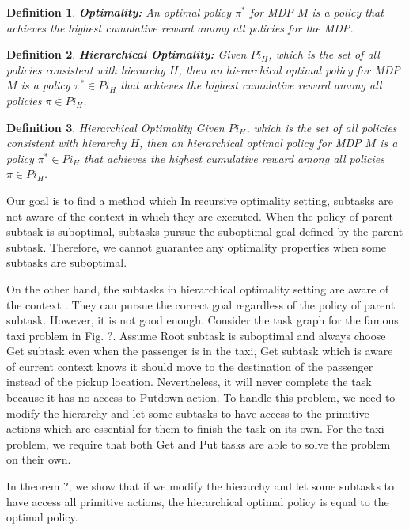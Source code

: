 \documentclass{article} %
\newtheorem{definition}{Definition}
\begin{document}
\begin{definition}
    \textbf{Optimality:} An optimal policy $\pi^*$ for MDP $M$ is a policy that achieves the highest cumulative reward
    among all policies for the MDP.
\end{definition}
\begin{definition}
    \textbf{Hierarchical Optimality:} Given $Pi_H$, which is the set of all policies consistent with hierarchy $H$, 
    then an hierarchical optimal policy for MDP $M$ is a policy $\pi^* \in Pi_H$ that achieves the highest cumulative reward
    among all policies $\pi \in Pi_H$.
\end{definition}
\begin{definition}
    Hierarchical Optimality Given $Pi_H$, which is the set of all policies consistent with hierarchy $H$, 
    then an hierarchical optimal policy for MDP $M$ is a policy $\pi^* \in Pi_H$ that achieves the highest cumulative reward
    among all policies $\pi \in Pi_H$.
\end{definition}

Our goal is to find a method which 
In recursive optimality setting, subtasks are not aware of the context in which they are executed.
When the policy of parent subtask is suboptimal, subtasks pursue the suboptimal goal defined by the parent subtask.
Therefore, we cannot guarantee any optimality properties when some subtasks are suboptimal.

On the other hand, the subtasks in hierarchical optimality setting are aware of the context . 
They can pursue the correct goal regardless of the policy of parent subtask.
However, it is not good enough. Consider the task graph for the famous taxi problem in Fig. ?.  
Assume Root subtask is suboptimal and always choose Get subtask even when 
the passenger is in the taxi, Get subtask which is aware of current context knows
it should move to the destination of the passenger instead of the pickup location.
Nevertheless, it will never complete the task because it has no access to Putdown 
action. To handle this problem, we need to modify the hierarchy and let some subtasks 
to have access to the primitive actions which are essential for them to finish
the task on its own. For the taxi problem, we require that both Get and Put tasks
are able to solve the problem on their own.

In theorem ?, we show that if we modify the hierarchy and let some subtasks to have access all primitive actions, 
the hierarchical optimal policy is equal to the optimal policy.
\end{document}
